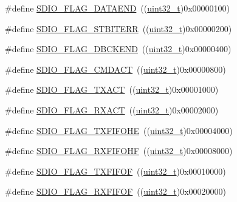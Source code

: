 \begin{DoxyCompactItemize}
\item 
\#define \hyperlink{group___s_d_i_o___flags_gaaacb2f6207c149e05f8bdd70e5d49926}{S\+D\+I\+O\+\_\+\+F\+L\+A\+G\+\_\+\+D\+A\+T\+A\+E\+ND}~((\hyperlink{_p_e___types_8h_a33594304e786b158f3fb30289278f5af}{uint32\+\_\+t})0x00000100)
\item 
\#define \hyperlink{group___s_d_i_o___flags_gae83f7cb3fa1183898131f3de47c2333e}{S\+D\+I\+O\+\_\+\+F\+L\+A\+G\+\_\+\+S\+T\+B\+I\+T\+E\+RR}~((\hyperlink{_p_e___types_8h_a33594304e786b158f3fb30289278f5af}{uint32\+\_\+t})0x00000200)
\item 
\#define \hyperlink{group___s_d_i_o___flags_ga5452d8033567821709bd7d5f06547b70}{S\+D\+I\+O\+\_\+\+F\+L\+A\+G\+\_\+\+D\+B\+C\+K\+E\+ND}~((\hyperlink{_p_e___types_8h_a33594304e786b158f3fb30289278f5af}{uint32\+\_\+t})0x00000400)
\item 
\#define \hyperlink{group___s_d_i_o___flags_gad12a9b2bd30e7b907cbabfd92fc645b3}{S\+D\+I\+O\+\_\+\+F\+L\+A\+G\+\_\+\+C\+M\+D\+A\+CT}~((\hyperlink{_p_e___types_8h_a33594304e786b158f3fb30289278f5af}{uint32\+\_\+t})0x00000800)
\item 
\#define \hyperlink{group___s_d_i_o___flags_gad5d075c98012586b169ec131aab2eeb5}{S\+D\+I\+O\+\_\+\+F\+L\+A\+G\+\_\+\+T\+X\+A\+CT}~((\hyperlink{_p_e___types_8h_a33594304e786b158f3fb30289278f5af}{uint32\+\_\+t})0x00001000)
\item 
\#define \hyperlink{group___s_d_i_o___flags_gacc935dd830338970890a05922dff8ab7}{S\+D\+I\+O\+\_\+\+F\+L\+A\+G\+\_\+\+R\+X\+A\+CT}~((\hyperlink{_p_e___types_8h_a33594304e786b158f3fb30289278f5af}{uint32\+\_\+t})0x00002000)
\item 
\#define \hyperlink{group___s_d_i_o___flags_gae9277461d3c8984dc31af318e2df1959}{S\+D\+I\+O\+\_\+\+F\+L\+A\+G\+\_\+\+T\+X\+F\+I\+F\+O\+HE}~((\hyperlink{_p_e___types_8h_a33594304e786b158f3fb30289278f5af}{uint32\+\_\+t})0x00004000)
\item 
\#define \hyperlink{group___s_d_i_o___flags_ga8c5942ae3df21efad2d7c61a46015758}{S\+D\+I\+O\+\_\+\+F\+L\+A\+G\+\_\+\+R\+X\+F\+I\+F\+O\+HF}~((\hyperlink{_p_e___types_8h_a33594304e786b158f3fb30289278f5af}{uint32\+\_\+t})0x00008000)
\item 
\#define \hyperlink{group___s_d_i_o___flags_gad3ca936300ef251639a4cfbe2f63b6b8}{S\+D\+I\+O\+\_\+\+F\+L\+A\+G\+\_\+\+T\+X\+F\+I\+F\+OF}~((\hyperlink{_p_e___types_8h_a33594304e786b158f3fb30289278f5af}{uint32\+\_\+t})0x00010000)
\item 
\#define \hyperlink{group___s_d_i_o___flags_gaf92cb783f000b8d946fe8ace81b51df2}{S\+D\+I\+O\+\_\+\+F\+L\+A\+G\+\_\+\+R\+X\+F\+I\+F\+OF}~((\hyperlink{_p_e___types_8h_a33594304e786b158f3fb30289278f5af}{uint32\+\_\+t})0x00020000)

\end{DoxyCompactItemize}
